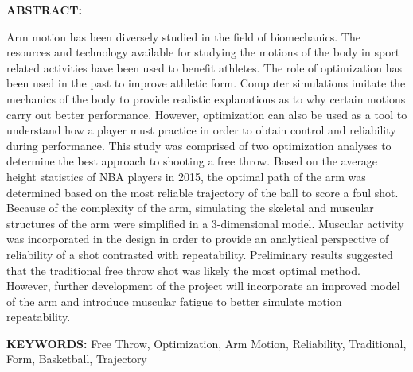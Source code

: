 \begin{mdframed}[style=MyFrame]
\textbf{ABSTRACT:} 

Arm motion has been diversely studied in the field of biomechanics.  The resources and technology available for studying the motions of the body in sport related activities have been used to benefit athletes.  The role of optimization has been used in the past to improve athletic form.  Computer simulations imitate the mechanics of the body to provide realistic explanations as to why certain motions carry out better performance.  However, optimization can also be used as a tool to understand how a player must practice in order to obtain control and reliability during performance.  This study was comprised of two optimization analyses to determine the best approach to shooting a free throw.  Based on the average height statistics of NBA players in 2015, the optimal path of the arm was determined based on the most reliable trajectory of the ball to score a foul shot. Because of the complexity of the arm, simulating the skeletal and muscular structures of the arm were simplified in a 3-dimensional model.  Muscular activity was incorporated in the design in order to provide an analytical perspective of reliability of a shot contrasted with repeatability. Preliminary results suggested that the traditional free throw shot was likely the most optimal method.  However, further development of the project will incorporate an improved model of the arm and introduce muscular fatigue to better simulate motion repeatability.

    \textbf{KEYWORDS:} Free Throw, Optimization, Arm Motion, Reliability, Traditional, Form, Basketball, Trajectory \\
\end{mdframed}

